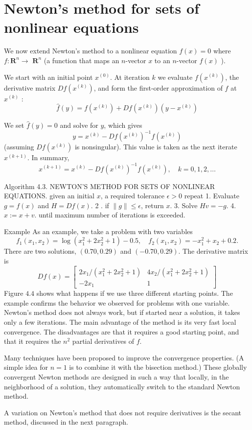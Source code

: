 \section{Newton's method for sets of nonlinear equations}

We now extend Newton's method to a nonlinear equation $ f(x)=0 $ where $ f: \mathbf{R}^{n} \rightarrow $ $ \mathbf{R}^{n} $ (a function that maps an $ n $-vector $ x $ to an $ n $-vector $ f(x) $ ).

We start with an initial point $ x^{(0)} $. At iteration $ k $ we evaluate $ f\left(x^{(k)}\right) $, the derivative matrix $ D f\left(x^{(k)}\right) $, and form the first-order approximation of $ f $ at $ x^{(k)} $ :
$$
\hat{f}(y)=f\left(x^{(k)}\right)+D f\left(x^{(k)}\right)\left(y-x^{(k)}\right)
$$

We set $ \hat{f}(y)=0 $ and solve for $ y $, which gives
$$
y=x^{(k)}-D f\left(x^{(k)}\right)^{-1} f\left(x^{(k)}\right)
$$
(assuming $ D f\left(x^{(k)}\right) $ is nonsingular). This value is taken as the next iterate $ x^{(k+1)} $. In summary,
$$
x^{(k+1)}=x^{(k)}-D f\left(x^{(k)}\right)^{-1} f\left(x^{(k)}\right), \quad k=0,1,2, \ldots
$$

\begin{algorithm}
    Algorithm 4.3. NEWTON'S METHOD FOR SETS OF NONLINEAR EQUATIONS.
given an initial $ x $, a required tolerance $ \epsilon>0 $
repeat
1. Evaluate $ g=f(x) $ and $ H=D f(x) $.
2 . if $ \|g\| \leq \epsilon $, return $ x $.
3. Solve $ H v=-g $.
4. $ x:=x+v $.
until maximum number of iterations is exceeded.
\end{algorithm}

\begin{example}
    Example As an example, we take a problem with two variables
$$
f_{1}\left(x_{1}, x_{2}\right)=\log \left(x_{1}^{2}+2 x_{2}^{2}+1\right)-0.5, \quad f_{2}\left(x_{1}, x_{2}\right)=-x_{1}^{2}+x_{2}+0.2 .
$$
There are two solutions, $ (0.70,0.29) $ and $ (-0.70,0.29) $. The derivative matrix is
$$
D f(x)=\left[\begin{array}{cc}
2 x_{1} /\left(x_{1}^{2}+2 x_{2}^{2}+1\right) & 4 x_{2} /\left(x_{1}^{2}+2 x_{2}^{2}+1\right) \\
-2 x_{1} & 1
\end{array}\right]
$$
Figure $ 4.4 $ shows what happens if we use three different starting points.
The example confirms the behavior we observed for problems with one variable. Newton's method does not always work, but if started near a solution, it takes only a few iterations. The main advantage of the method is its very fast local convergence. The disadvantages are that it requires a good starting point, and that it requires the $ n^{2} $ partial derivatives of $ f $.

Many techniques have been proposed to improve the convergence properties. (A simple idea for $ n=1 $ is to combine it with the bisection method.) These globally convergent Newton methods are designed in such a way that locally, in the neighborhood of a solution, they automatically switch to the standard Newton method.

A variation on Newton's method that does not require derivatives is the secant method, discussed in the next paragraph.
\end{example}


